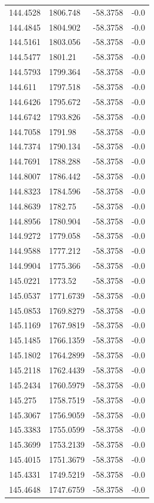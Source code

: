\begin{table}[H]
\begin{tabular}{llll}
144.4528 & 1806.748 & -58.3758 & -0.0 \\
144.4845 & 1804.902 & -58.3758 & -0.0 \\
144.5161 & 1803.056 & -58.3758 & -0.0 \\
144.5477 & 1801.21 & -58.3758 & -0.0 \\
144.5793 & 1799.364 & -58.3758 & -0.0 \\
144.611 & 1797.518 & -58.3758 & -0.0 \\
144.6426 & 1795.672 & -58.3758 & -0.0 \\
144.6742 & 1793.826 & -58.3758 & -0.0 \\
144.7058 & 1791.98 & -58.3758 & -0.0 \\
144.7374 & 1790.134 & -58.3758 & -0.0 \\
144.7691 & 1788.288 & -58.3758 & -0.0 \\
144.8007 & 1786.442 & -58.3758 & -0.0 \\
144.8323 & 1784.596 & -58.3758 & -0.0 \\
144.8639 & 1782.75 & -58.3758 & -0.0 \\
144.8956 & 1780.904 & -58.3758 & -0.0 \\
144.9272 & 1779.058 & -58.3758 & -0.0 \\
144.9588 & 1777.212 & -58.3758 & -0.0 \\
144.9904 & 1775.366 & -58.3758 & -0.0 \\
145.0221 & 1773.52 & -58.3758 & -0.0 \\
145.0537 & 1771.6739 & -58.3758 & -0.0 \\
145.0853 & 1769.8279 & -58.3758 & -0.0 \\
145.1169 & 1767.9819 & -58.3758 & -0.0 \\
145.1485 & 1766.1359 & -58.3758 & -0.0 \\
145.1802 & 1764.2899 & -58.3758 & -0.0 \\
145.2118 & 1762.4439 & -58.3758 & -0.0 \\
145.2434 & 1760.5979 & -58.3758 & -0.0 \\
145.275 & 1758.7519 & -58.3758 & -0.0 \\
145.3067 & 1756.9059 & -58.3758 & -0.0 \\
145.3383 & 1755.0599 & -58.3758 & -0.0 \\
145.3699 & 1753.2139 & -58.3758 & -0.0 \\
145.4015 & 1751.3679 & -58.3758 & -0.0 \\
145.4331 & 1749.5219 & -58.3758 & -0.0 \\
145.4648 & 1747.6759 & -58.3758 & -0.0 \\

\end{tabular}
\end{table}
